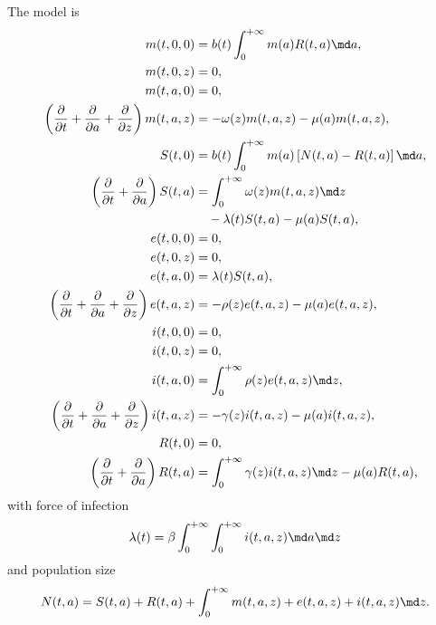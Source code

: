 \documentclass{jpmarticle}
\begin{document}
The model is
\begin{equation}
  \label{model_age_and_time_since_entry_structured}
  \begin{split}
    m(t, 0, 0) &=
    b(t) \int_0^{+\infty} m(a) R(t, a) \md a,
    \\
    m(t, 0, z) &=
    0,
    \\
    m(t, a, 0) &=
    0,
    \\
    \left(\frac{\partial}{\partial t}
      + \frac{\partial}{\partial a}
      + \frac{\partial}{\partial z}\right)
    m(t, a, z) &=
    - \omega(z) m(t, a, z) - \mu(a) m(t, a, z),
    \\
    S(t, 0) &=
    b(t) \int_0^{+\infty} m(a) \left[N(t, a) - R(t, a)\right] \md a,
    \\
    \left(\frac{\partial}{\partial t}
      + \frac{\partial}{\partial a}\right)
    S(t, a) &=
    \int_0^{+\infty} \omega(z) m(t, a, z) \md z
    \\ & \quad {}
    - \lambda(t) S(t, a) - \mu(a) S(t, a),
    \\
    e(t, 0, 0) &=
    0,
    \\
    e(t, 0, z) &=
    0,
    \\
    e(t, a, 0) &=
    \lambda(t) S(t, a),
    \\
    \left(\frac{\partial}{\partial t}
      + \frac{\partial}{\partial a}
      + \frac{\partial}{\partial z}\right)
    e(t, a, z) &=
    - \rho(z) e(t, a, z) - \mu(a) e(t, a, z),
    \\
    i(t, 0, 0) &=
    0,
    \\
    i(t, 0, z) &=
    0,
    \\
    i(t, a, 0) &=
    \int_0^{+\infty} \rho(z) e(t, a, z) \md z,
    \\
    \left(\frac{\partial}{\partial t}
      + \frac{\partial}{\partial a}
      + \frac{\partial}{\partial z}\right)
    i(t, a, z) &=
    - \gamma(z) i(t, a, z) - \mu(a) i(t, a, z),
    \\
    R(t, 0) &=
    0,
    \\
    \left(\frac{\partial}{\partial t}
      + \frac{\partial}{\partial a}\right)
    R(t, a) &=
    \int_0^{+\infty} \gamma(z) i(t, a, z) \md z
    - \mu(a) R(t, a),
  \end{split}
\end{equation}
with force of infection
\begin{equation}
  \lambda(t) =
  \beta
  \int_0^{+\infty} \int_0^{+\infty}
  i(t, a, z)
  \md a \md z
\end{equation}
and population size
\begin{equation}
  N(t, a) =
  S(t, a) + R(t, a)
  + \int_0^{+\infty} m(t, a, z) + e(t, a, z) + i(t, a, z) \md z.
\end{equation}
\end{document}
